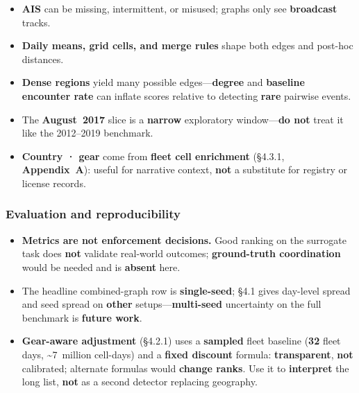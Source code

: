 \documentclass[
]{article}
\providecommand{\tightlist}{%
  \setlength{\itemsep}{0pt}\setlength{\parskip}{0pt}}
\begin{document}
\begin{itemize}
\tightlist
\item
  \textbf{AIS} can be missing, intermittent, or misused; graphs only see
  \textbf{broadcast} tracks.\\
\item
  \textbf{Daily means, grid cells, and merge rules} shape both edges and
  post-hoc distances.\\
\item
  \textbf{Dense regions} yield many possible edges---\textbf{degree} and
  \textbf{baseline encounter rate} can inflate scores relative to
  detecting \textbf{rare} pairwise events.\\
\item
  The \textbf{August~2017} slice is a \textbf{narrow} exploratory
  window---\textbf{do not} treat it like the 2012--2019 benchmark.\\
\item
  \textbf{Country · gear} come from \textbf{fleet cell enrichment}
  (§4.3.1, \textbf{Appendix~A}): useful for narrative context,
  \textbf{not} a substitute for registry or license records.
\end{itemize}

\subsubsection{Evaluation and
reproducibility}\label{evaluation-and-reproducibility}

\begin{itemize}
\tightlist
\item
  \textbf{Metrics are not enforcement decisions.} Good ranking on the
  surrogate task does \textbf{not} validate real-world outcomes;
  \textbf{ground-truth coordination} would be needed and is
  \textbf{absent} here.\\
\item
  The headline combined-graph row is \textbf{single-seed}; §4.1 gives
  day-level spread and seed spread on \textbf{other}
  setups---\textbf{multi-seed} uncertainty on the full benchmark is
  \textbf{future work}.\\
\item
  \textbf{Gear-aware adjustment} (§4.2.1) uses a \textbf{sampled} fleet
  baseline (\textbf{32} fleet days, \textasciitilde7~million cell-days)
  and a \textbf{fixed discount} formula: \textbf{transparent},
  \textbf{not} calibrated; alternate formulas would \textbf{change
  ranks}. Use it to \textbf{interpret} the long list, \textbf{not} as a
  second detector replacing geography.
\end{itemize}
\end{document}
